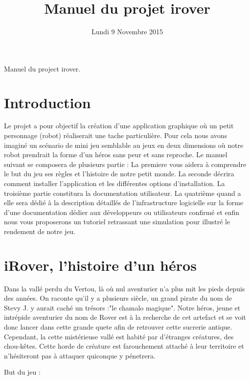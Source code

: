 \documentclass[a4paper 12pts]{article}
\title{Manuel du projet irover}
\date{Lundi 9 Novembre 2015}
\author{}
\begin{document}
\maketitle

Manuel du project irover.


\newpage

\tableofcontents

\section{Introduction}



Le projet a pour objectif la création d'une application graphique où un petit personnage (robot) réaliserait une tache particulière.
Pour cela nous avons imaginé un scénario de mini jeu semblable au jeux en deux dimensions où notre robot prendrait la forme d'un héros sans peur et sans reproche.
Le manuel suivant se composera de plusieurs partie :
La premiere vous aidera à comprendre le but du jeu ses règles et l'histoire de notre petit monde.
La seconde décrira comment installer l'application et les différentes options d'installation.
La troisième partie constitura la documentation utilisateur.
La quatrième quand a elle sera dédié à la description détaillés de l'infrastructure logicielle sur la forme d'une documentation dédier aux développeurs ou utilisateurs confirmé et enfin nous vous proposerons un tutoriel retrassant une simulation pour illustré le rendement de notre jeu.


\section{iRover, l'histoire d'un héros}


Dans la vallé perdu du Vertou, là où nul aventurier n'a plus mit les pieds depuis des années. On raconte qu'il y a 
plusieurs siècle, un grand pirate du nom de Stevy J. y aurait caché un trésors :"le chamalo magique".
Notre héros, jeune et intrépide aventurier du nom de Rover est à la recherche de cet artefact et se voit donc lancer 
dans cette grande quete afin de retrouver cette sucrerie antique.
Cependant, la cette mistérieuse vallé est habité par d'étranges créatures, des chou-kêtes. 
Cette horde de créature est farouchement attaché à leur territoire et n'hésiteront pas à attaquer quiconque y pénetrera.


But du jeu :
\end{document}
